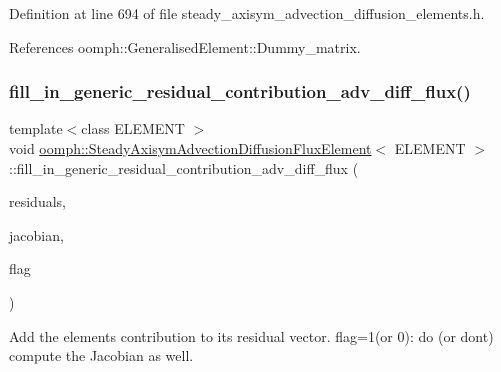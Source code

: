 Definition at line 694 of file steady\+\_\+axisym\+\_\+advection\+\_\+diffusion\+\_\+elements.\+h.



References oomph\+::\+Generalised\+Element\+::\+Dummy\+\_\+matrix.

\mbox{\label{classoomph_1_1SteadyAxisymAdvectionDiffusionFluxElement_ab9bb9d085a2f05045a0c78cc7210a25f}} 
\subsubsection{\texorpdfstring{fill\+\_\+in\+\_\+generic\+\_\+residual\+\_\+contribution\+\_\+adv\+\_\+diff\+\_\+flux()}{fill\_in\_generic\_residual\_contribution\_adv\_diff\_flux()}}
{\footnotesize\ttfamily template$<$class E\+L\+E\+M\+E\+NT $>$ \\
void \hyperlink{classoomph_1_1SteadyAxisymAdvectionDiffusionFluxElement}{oomph\+::\+Steady\+Axisym\+Advection\+Diffusion\+Flux\+Element}$<$ E\+L\+E\+M\+E\+NT $>$\+::fill\+\_\+in\+\_\+generic\+\_\+residual\+\_\+contribution\+\_\+adv\+\_\+diff\+\_\+flux (\begin{DoxyParamCaption}\item[{\hyperlink{classoomph_1_1Vector}{Vector}$<$ double $>$ \&}]{residuals,  }\item[{\hyperlink{classoomph_1_1DenseMatrix}{Dense\+Matrix}$<$ double $>$ \&}]{jacobian,  }\item[{unsigned}]{flag }\end{DoxyParamCaption})\hspace{0.3cm}{\ttfamily [private]}}



Add the element\textquotesingle{}s contribution to its residual vector. flag=1(or 0)\+: do (or don\textquotesingle{}t) compute the Jacobian as well. 

